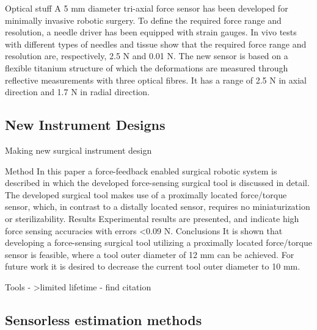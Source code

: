 Optical stuff \cite{_micro_2004}
A 5 mm diameter tri-axial force sensor has been developed for minimally invasive robotic surgery. To define the required force range and resolution, a needle driver has been equipped with strain gauges. In vivo tests with different types of needles and tissue show that the required force range and resolution are, respectively, 2.5 N and 0.01 N. The new sensor is based on a flexible titanium structure of which the deformations are measured through reflective measurements with three optical fibres. It has a range of 2.5 N in axial direction and 1.7 N in radial direction.

\subsection{New Instrument Designs}
Making new surgical instrument design \cite{schwalb_forcesensing_2017}

Method In this paper a force-feedback enabled surgical robotic system is 
described in which the developed force-sensing surgical tool is discussed in detail. The developed surgical tool makes use of a proximally located 
force/torque sensor, which, in contrast to a distally located sensor, 
requires no miniaturization or sterilizability. Results Experimental results 
are presented, and indicate high force sensing accuracies with errors <0.09 N. 
Conclusions It is shown that developing a force-sensing surgical tool utilizing a proximally located force/torque sensor is feasible, where a tool outer diameter of 12 mm can be achieved. For future work it is desired to decrease the current tool outer diameter to 10 mm. 

Tools - >limited lifetime - find citation

\subsection{Sensorless estimation methods}

